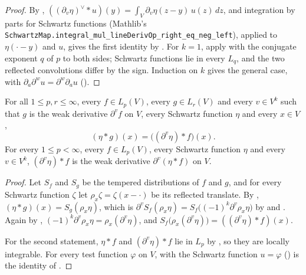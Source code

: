 \begin{proof}
\leanok
By ,
$((\partial_v \eta)^\vee * u)(y) = \int_V \partial_v \eta(z - y) \, u(z) \, dz$, and
integration by parts for Schwartz functions (Mathlib's
\texttt{SchwartzMap.\allowbreak integral\_mul\_lineDerivOp\_right\_eq\_neg\_left}), applied to
$\eta(\cdot - y)$ and $u$, gives the first identity by . For
$k = 1$, apply  with the conjugate exponent $q$ of $p$ to both
sides; Schwartz functions lie in every $L_q$, and the two reflected convolutions differ by the
sign. Induction on $k$ gives the general case, with
$\partial_a \partial^w u = \partial^w \partial_a u$
().
\end{proof}

\begin{theorem}
\label{thm:weak-derivative-convolution}
\leanok
{}
For all $1 \leq p, r \leq \infty$, every $f \in L_p(V)$, every $g \in L_r(V)$ and every
$v \in V^k$ such that $g$ is the weak derivative $\partial^v f$ on $V$, every Schwartz
function $\eta$ and every $x \in V$,
\[
  (\eta * g)(x) = \bigl((\partial^v \eta) * f\bigr)(x) .
\]
For every $1 \leq p < \infty$, every $f \in L_p(V)$, every Schwartz function $\eta$ and every
$v \in V^k$, $(\partial^v \eta) * f$ is the weak derivative $\partial^v (\eta * f)$ on $V$.
\end{theorem}

\begin{proof}
\leanok
Let $S_f$ and $S_g$ be the tempered distributions of $f$ and $g$, and for every Schwartz
function $\zeta$ let $\rho_x \zeta = \zeta(x - \cdot)$ be its reflected translate.
By , $(\eta * g)(x) = S_g(\rho_x \eta)$, which is
$\partial^v S_f(\rho_x \eta) = S_f\bigl((-1)^k \partial^v \rho_x \eta\bigr)$ by
 and . Again by
, $(-1)^k \partial^v \rho_x \eta = \rho_x(\partial^v \eta)$,
and $S_f\bigl(\rho_x(\partial^v \eta)\bigr) = ((\partial^v \eta) * f)(x)$.

For the second statement, $\eta * f$ and $(\partial^v \eta) * f$ lie in $L_p$ by
, so they are locally integrable. For every test function $\varphi$ on $V$,
 with the Schwartz function $u = \varphi$
() is the identity of .
\end{proof}

